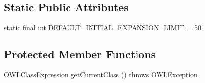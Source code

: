 \subsection*{Static Public Attributes}
\begin{DoxyCompactItemize}
\item 
static final int \hyperlink{classorg_1_1semanticweb_1_1owlapi_1_1debugging_1_1_black_box_o_w_l_debugger_ade79e6d1004a02475754229eb9a36464}{D\-E\-F\-A\-U\-L\-T\-\_\-\-I\-N\-I\-T\-I\-A\-L\-\_\-\-E\-X\-P\-A\-N\-S\-I\-O\-N\-\_\-\-L\-I\-M\-I\-T} = 50
\end{DoxyCompactItemize}
\subsection*{Protected Member Functions}
\begin{DoxyCompactItemize}
\item 
\hyperlink{interfaceorg_1_1semanticweb_1_1owlapi_1_1model_1_1_o_w_l_class_expression}{O\-W\-L\-Class\-Expression} \hyperlink{classorg_1_1semanticweb_1_1owlapi_1_1debugging_1_1_black_box_o_w_l_debugger_aa726f3d8c3218e1ceff3890f3038d3b5}{get\-Current\-Class} ()  throws O\-W\-L\-Exception 
\end{DoxyCompactItemize}
